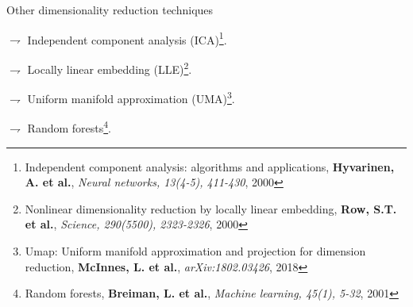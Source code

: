 \documentclass[9pt]{beamer}
\begin{document}
\begin{frame}{Other dimensionality reduction techniques}

$\rightharpoondown$  \textcolor{lighto}{Independent component analysis} (ICA)\footnote{{\tiny Independent component analysis: algorithms and applications, {\bf Hyvarinen, A. et al.}, {\em Neural networks, 13(4-5), 411-430}}, 2000}.

\vspace{.3cm}

$\rightharpoondown$ \textcolor{lighto}{Locally linear embedding} (LLE)\footnote{{\tiny Nonlinear dimensionality reduction by locally linear embedding, {\bf Row, S.T. et al.}, {\em Science, 290(5500), 2323-2326}}, 2000}.

\vspace{.3cm}

$\rightharpoondown$ \textcolor{lighto}{Uniform manifold approximation} (UMA)\footnote{{\tiny Umap: Uniform manifold approximation and projection for dimension reduction, {\bf McInnes, L. et al.}, {\em  arXiv:1802.03426}}, 2018}.

\vspace{.3cm}

$\rightharpoondown$ \textcolor{lighto}{Random forests}\footnote{{\tiny Random forests, {\bf Breiman, L. et al.}, {\em Machine learning, 45(1), 5-32}}, 2001}.

\end{frame}
\end{document}
